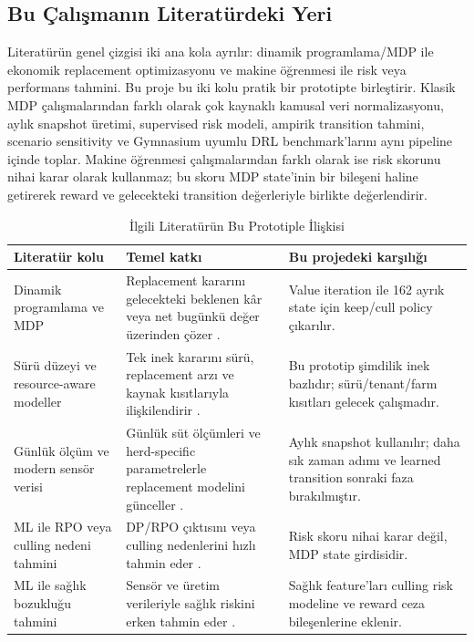 \documentclass[conference]{IEEEtran}
\begin{document}
\subsection{Bu Çalışmanın Literatürdeki Yeri}
Literatürün genel çizgisi iki ana kola ayrılır: dinamik programlama/MDP ile
ekonomik replacement optimizasyonu ve makine öğrenmesi ile risk veya performans
tahmini. Bu proje bu iki kolu pratik bir prototipte birleştirir. Klasik MDP
çalışmalarından farklı olarak çok kaynaklı kamusal veri normalizasyonu, aylık
snapshot üretimi, supervised risk modeli, ampirik transition tahmini, scenario
sensitivity ve Gymnasium uyumlu DRL benchmark'larını aynı pipeline içinde
toplar. Makine öğrenmesi çalışmalarından farklı olarak ise risk skorunu nihai
karar olarak kullanmaz; bu skoru MDP state'inin bir bileşeni haline getirerek
reward ve gelecekteki transition değerleriyle birlikte değerlendirir.

\begin{table}[!t]
\caption{İlgili Literatürün Bu Prototiple İlişkisi}
\label{tab:literature_positioning}
\centering
\begin{tabular}{p{}p{}p{}}
\toprule
Literatür kolu & Temel katkı & Bu projedeki karşılığı \\
\midrule
Dinamik programlama ve MDP & Replacement kararını gelecekteki beklenen kâr
veya net bugünkü değer üzerinden çözer \cite{stewart1977,kristensen1987,delorenzo1992}. &
Value iteration ile 162 ayrık state için keep/cull policy çıkarılır. \\
Sürü düzeyi ve resource-aware modeller & Tek inek kararını sürü, replacement
arzı ve kaynak kısıtlarıyla ilişkilendirir \cite{yates1998,rajala2000}. &
Bu prototip şimdilik inek bazlıdır; sürü/tenant/farm kısıtları gelecek
çalışmadır. \\
Günlük ölçüm ve modern sensör verisi & Günlük süt ölçümleri ve herd-specific
parametrelerle replacement modelini günceller \cite{nielsen2010}. & Aylık
snapshot kullanılır; daha sık zaman adımı ve learned transition sonraki faza
bırakılmıştır. \\
ML ile RPO veya culling nedeni tahmini & DP/RPO çıktısını veya culling
nedenlerini hızlı tahmin eder \cite{shahinfar2014,adamczyk2021}. & Risk skoru
nihai karar değil, MDP state girdisidir. \\
ML ile sağlık bozukluğu tahmini & Sensör ve üretim verileriyle sağlık riskini
erken tahmin eder \cite{zhou2022}. & Sağlık feature'ları culling risk modeline
ve reward ceza bileşenlerine eklenir. \\
\bottomrule
\end{tabular}
\end{table}
\end{document}
